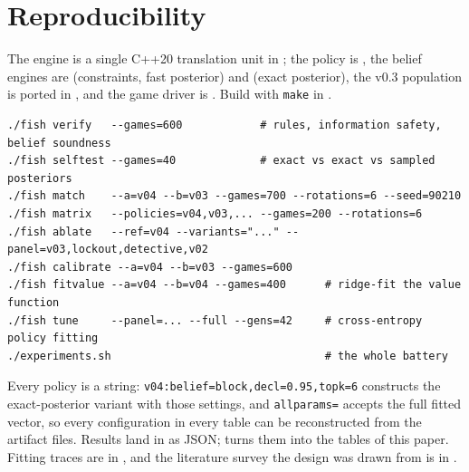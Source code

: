 \section{Reproducibility}
\label{sec:repro}

The engine is a single C++20 translation unit in ; the policy
is , the belief engines are 
(constraints, fast posterior) and  (exact posterior),
the v0.3 population is ported in , and the game
driver is . Build with \verb|make| in .

\begin{verbatim}
./fish verify   --games=600            # rules, information safety, belief soundness
./fish selftest --games=40             # exact vs exact vs sampled posteriors
./fish match    --a=v04 --b=v03 --games=700 --rotations=6 --seed=90210
./fish matrix   --policies=v04,v03,... --games=200 --rotations=6
./fish ablate   --ref=v04 --variants="..." --panel=v03,lockout,detective,v02
./fish calibrate --a=v04 --b=v03 --games=600
./fish fitvalue --a=v04 --b=v04 --games=400      # ridge-fit the value function
./fish tune     --panel=... --full --gens=42     # cross-entropy policy fitting
./experiments.sh                                 # the whole battery
\end{verbatim}

Every policy is a string: \verb|v04:belief=block,decl=0.95,topk=6| constructs the
exact-posterior variant with those settings, and \verb|allparams=| accepts the
full fitted vector, so every configuration in every table can be reconstructed
from the artifact files. Results land in  as JSON;
 turns them into the tables of this paper. Fitting
traces are in , and the literature survey the design was
drawn from is in .
